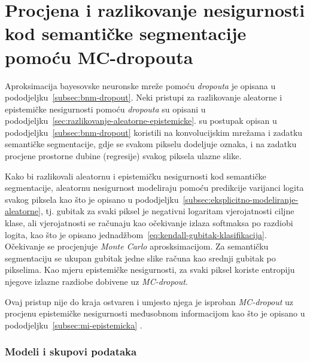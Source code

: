 \documentclass[utf8, diplomski, lmodern]{fer}
\begin{document}
\section{Procjena i razlikovanje nesigurnosti kod semantičke segmentacije pomoću MC-dropouta}

Aproksimacija bayesovske neuronske mreže pomoću \textit{dropouta} \citep{Gal:2015:DBA,Gal:2015:DBA,Gal:2016:BCNNBAVI} je opisana u pododjeljku~\ref{subsec:bnm-dropout}. Neki pristupi \citep{Kendall:2017:WUNBDLCV,Smith:2018:UMUAED} za razlikovanje aleatorne i epistemičke nesigurnosti pomoću \textit{dropouta} su opisani u pododjeljku~\ref{sec:razlikovanje-aleatorne-epistemicke}. \citet{Kendall:2017:WUNBDLCV} su postupak opisan u pododjeljku~\ref{subsec:bnm-dropout} koristili na konvolucijskim mrežama i zadatku semantičke segmentacije, gdje se svakom pikselu dodeljuje oznaka, i na zadatku procjene prostorne dubine (regresije) svakog piksela ulazne slike. 

Kako bi razlikovali aleatornu i epistemičku nesigurnosti kod semantičke segmentacije, \citet{Kendall:2017:WUNBDLCV} aleatornu nesigurnost modeliraju pomoću predikcije varijanci logita svakog piksela kao što je opisano u pododjeljku~\ref{subsec:eksplicitno-modeliranje-aleatorne}, tj. gubitak za svaki piksel je negativni logaritam vjerojatnosti ciljne klase, ali vjerojatnosti se računaju kao očekivanje izlaza softmaksa po razdiobi logita, kao što je opisano jednadžbom~\eqref{eq:kendall-gubitak-klasifikacija}. Očekivanje se procjenjuje \textit{Monte Carlo} aprosksimacijom. Za semantičku segmentaciju se ukupan gubitak jedne slike računa kao srednji gubitak po pikselima. Kao mjeru epistemičke nesigurnosti, \citet{Kendall:2017:WUNBDLCV} za svaki piksel koriste entropiju njegove izlazne razdiobe dobivene uz \textit{MC-dropout}.

Ovaj pristup nije do kraja ostvaren i umjesto njega je isproban \textit{MC-dropout} uz procjenu epistemičke nesigurnosti međusobnom informacijom kao što je opisano u pododjeljku~\ref{subsec:mi-epistemicka} \citep{Smith:2018:UMUAED}.

\subsubsection{Modeli i skupovi podataka}
\end{document}
